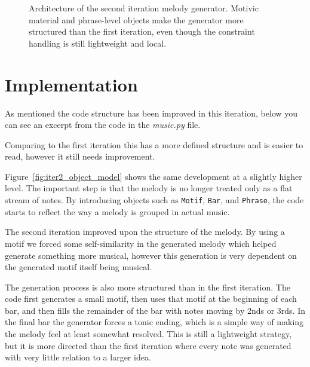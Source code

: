 \begin{figure}[htbp]
{%
  }
  \caption{Architecture of the second iteration melody generator. Motivic material and phrase-level objects make the generator more structured than the first iteration, even though the constraint handling is still lightweight and local.}\label{fig:iter2_architecture}
\end{figure}

\clearpage
\section{Implementation}
As mentioned the code structure has been improved in this iteration, below you can see an excerpt from the code in the \textit{music.py} file.

Comparing to the first iteration this has a more defined structure and is easier to read, however it still needs improvement.

Figure~\ref{fig:iter2_object_model} shows the same development at a slightly higher level. The important step is that the melody is no longer treated only as a flat stream of notes. By introducing objects such as \texttt{Motif}, \texttt{Bar}, and \texttt{Phrase}, the code starts to reflect the way a melody is grouped in actual music.



The second iteration improved upon the structure of the melody. By using a motif we forced some self-similarity in the generated melody which helped generate something more musical, however this generation is very dependent on the generated motif itself being musical.

The generation process is also more structured than in the first iteration. The code first generates a small motif, then uses that motif at the beginning of each bar, and then fills the remainder of the bar with notes moving by 2nds or 3rds. In the final bar the generator forces a tonic ending, which is a simple way of making the melody feel at least somewhat resolved. This is still a lightweight strategy, but it is more directed than the first iteration where every note was generated with very little relation to a larger idea.

